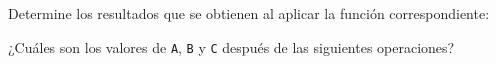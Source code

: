 \documentclass[spanish,addpoints,answers,a4paper]{exam}
\begin{document}
\begin{questions}
\begin{solution}
\end{solution}

\question Determine los resultados que se obtienen al aplicar la función correspondiente:
\begin{multicols}{2}
\end{multicols}

\begin{solution}

\end{solution}

\question ¿Cuáles son los valores de \texttt{A}, \texttt{B} y \texttt{C} después de las siguientes operaciones?


\end{questions}
\end{document}
